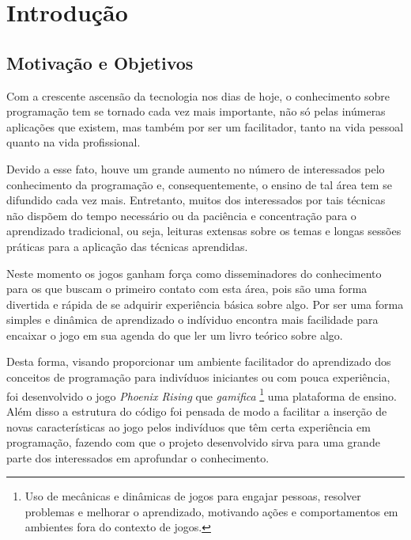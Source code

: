 \chapter{Introdução}
\label{cap:introducao}

\section{Motivação e Objetivos}

Com a crescente ascensão da tecnologia nos dias de hoje, o conhecimento sobre
programação tem se tornado cada vez mais importante, não só pelas inúmeras
aplicações que existem, mas também por ser um facilitador, tanto na vida
pessoal quanto na vida profissional.

Devido a esse fato, houve um grande aumento no número de interessados pelo
conhecimento da programação e, consequentemente, o ensino de tal área tem se
difundido cada vez mais. Entretanto, muitos dos interessados por tais técnicas
não dispõem do tempo necessário ou da paciência e concentração para o 
aprendizado tradicional, ou seja, leituras extensas sobre os temas e longas 
sessões práticas para a aplicação das técnicas aprendidas.

Neste momento os jogos ganham força como disseminadores do conhecimento para os 
que buscam o primeiro contato com esta área, pois são
uma forma divertida e rápida de se adquirir experiência básica sobre algo.
Por ser uma forma simples e dinâmica de aprendizado o indíviduo encontra mais
facilidade para encaixar o jogo em sua agenda do que ler um livro teórico sobre
algo.

Desta forma, visando proporcionar um ambiente facilitador do aprendizado dos
conceitos de programação para indivíduos iniciantes ou com pouca experiência,
foi desenvolvido o jogo \textit{Phoenix Rising} que \textit{gamifica}
\footnote{Uso de 
mecânicas e dinâmicas de jogos para engajar pessoas, resolver problemas e 
melhorar o aprendizado, motivando ações e comportamentos em ambientes fora do 
contexto de jogos.} uma plataforma de ensino. Além disso a estrutura do 
código foi pensada de modo a facilitar a inserção de novas características ao 
jogo pelos indivíduos que têm certa experiência em programação, fazendo com que
o projeto desenvolvido sirva para uma grande parte dos interessados em 
aprofundar o conhecimento.


